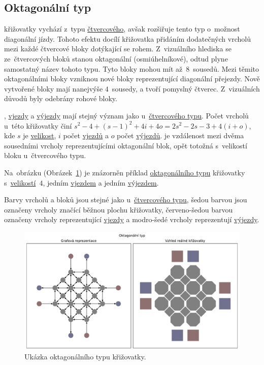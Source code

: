 \subsection{Oktagonální typ}\label{subsec:oktagonalni_typ}

 křižovatky vychází z~typu \hyperref[subsec:ctvercovy_typ]{čtvercového},
avšak rozšiřuje tento typ o~možnost diagonální jízdy.
Tohoto efektu docílí křižovatka přidáním dodatečných vrcholů mezi každé čtvercové bloky dotýkající se rohem.
Z~vizuálního hlediska se ze~čtvercových bloků stanou oktagonální (osmiúhelníkové),
odtud plyne samostatný název tohoto typu.
Tyto bloky mohou mít až~$8$~sousedů.
Mezi těmito oktagonálními bloky vzniknou nové bloky reprezentující diagonální přejezdy.
Nově vytvořené bloky mají nanejvýše $4$~sousedy, a tvoří pomyslný čtverec.
Z~vizuálních důvodů byly odebrány rohové bloky.

, \hyperref[par:vjezdy]{vjezdy} a \hyperref[par:vyjezdy]{výjezdy}
mají stejný význam jako u~\hyperref[subsec:ctvercovy_typ]{čtvercového typu}.
Počet vrcholů u~této křižovatky činí $s^2 - 4 + (s-1)^2 + 4i + 4o = 2s^2 - 2s - 3 + 4(i + o)$,
kde $s$ je \hyperref[par:velikost_krizovatky]{velikost},
$i$ počet \hyperref[par:vjezdy]{vjezdů} a $o$ počet \hyperref[par:vyjezdy]{výjezdů}.
 je vzdálenost mezi dvěma sousedními vrcholy reprezentujícími oktagonální blok,
opět totožná s~velikostí bloku u~čtvercového typu.

Na~obrázku (Obrázek~\ref{fig:octagonal_type_graph}) je znázorněn příklad
\hyperref[subsec:oktagonali_typ]{oktagonálního typu} křižovatky s~\hyperref[par:velikost_krizovatky]{velikostí}~$4$,
jedním \hyperref[par:vjezdy]{vjezdem} a jedním \hyperref[par:vyjezdy]{výjezdem}.

Barvy vrcholů a bloků jsou stejné jako u~\hyperref[subsec:ctvercovy_typ]{čtvercového typu},
šedou barvou jsou označeny vrcholy značící běžnou plochu křižovatky,
červeno-šedou barvou označeny vrcholy reprezentující \hyperref[par:vjezdy]{vjezdy} a
modro-šedé vrcholy reprezentují \hyperref[par:vyjezdy]{výjezdy}.

\begin{figure}[h]
	\centering
	\includegraphics[width=\textwidth]{../img/Octagonal_grid}
	\caption{Ukázka oktagonálního typu křižovatky.}
	\label{fig:octagonal_type_graph}
\end{figure}

